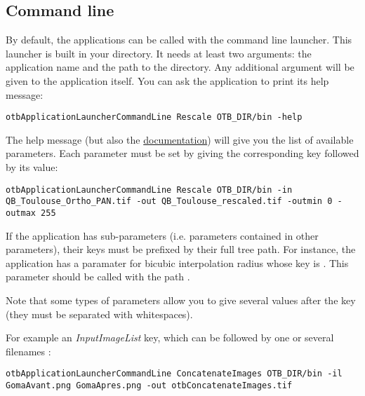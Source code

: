 \subsection{Command line}\label{sec:wrappedAppliCmdLine}
By default, the applications can be called with the command line launcher. This launcher
is built in your  directory. It needs at least two arguments: the 
application name and the path to the  directory. Any additional argument
will be given to the application itself. You can ask the application to print its help
message:
\begin{verbatim}
otbApplicationLauncherCommandLine Rescale OTB_DIR/bin -help
\end{verbatim}
The help message (but also the \href{http://orfeo-toolbox.org/Applications}{documentation})
will give you the list of available parameters. Each parameter must be set by giving the 
corresponding key followed by its value:
\begin{verbatim}
otbApplicationLauncherCommandLine Rescale OTB_DIR/bin -in QB_Toulouse_Ortho_PAN.tif -out QB_Toulouse_rescaled.tif -outmin 0 -outmax 255
\end{verbatim}

If the application has sub-parameters (i.e. parameters contained in other parameters), 
their keys must be prefixed by their full tree path. For instance, the application 
 has a paramater for bicubic interpolation radius whose key is .
This parameter should be called with the path .

Note that some types of parameters allow you to give several values after the key (they must
be separated with whitespaces).

For example an \emph{InputImageList} key, which can be followed by one or several filenames :

\begin{verbatim}
otbApplicationLauncherCommandLine ConcatenateImages OTB_DIR/bin -il GomaAvant.png GomaApres.png -out otbConcatenateImages.tif
\end{verbatim}


